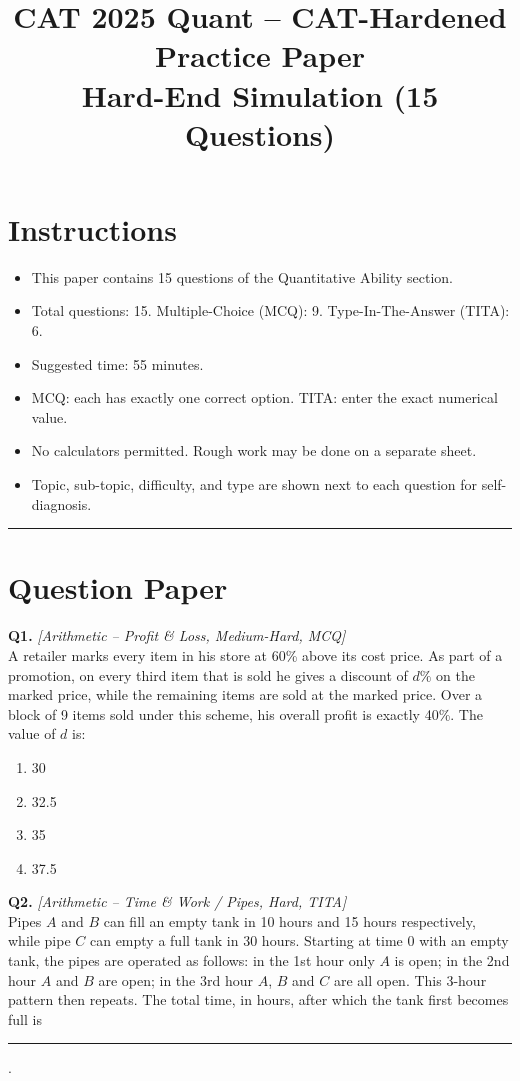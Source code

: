 \documentclass[11pt,a4paper]{article}
\title{\textbf{CAT 2025 Quant -- CAT-Hardened Practice Paper}\\[4pt]
\large Hard-End Simulation (15 Questions)}
\author{}
\date{}
\begin{document}
\maketitle

\section*{Instructions}
\begin{itemize}[leftmargin=*]
  \item This paper contains 15 questions of the Quantitative Ability section.
  \item Total questions: 15. Multiple-Choice (MCQ): 9. Type-In-The-Answer (TITA): 6.
  \item Suggested time: 55 minutes.
  \item MCQ: each has exactly one correct option. TITA: enter the exact numerical value.
  \item No calculators permitted. Rough work may be done on a separate sheet.
  \item Topic, sub-topic, difficulty, and type are shown next to each question for self-diagnosis.
\end{itemize}

\hrule

\section*{Question Paper}

\textbf{Q1.} \textit{[Arithmetic -- Profit \& Loss, Medium-Hard, MCQ]}\\
A retailer marks every item in his store at 60\% above its cost price. As part of a promotion, on every third item that is sold he gives a discount of $d\%$ on the marked price, while the remaining items are sold at the marked price. Over a block of 9 items sold under this scheme, his overall profit is exactly 40\%. The value of $d$ is:
\begin{enumerate}[label=(\Alph*)]
  \item 30
  \item 32.5
  \item 35
  \item 37.5
\end{enumerate}

\textbf{Q2.} \textit{[Arithmetic -- Time \& Work / Pipes, Hard, TITA]}\\
Pipes $A$ and $B$ can fill an empty tank in 10 hours and 15 hours respectively, while pipe $C$ can empty a full tank in 30 hours. Starting at time $0$ with an empty tank, the pipes are operated as follows: in the 1st hour only $A$ is open; in the 2nd hour $A$ and $B$ are open; in the 3rd hour $A$, $B$ and $C$ are all open. This 3-hour pattern then repeats. The total time, in hours, after which the tank first becomes full is \rule{2cm}{0.4pt}.
\end{document}
